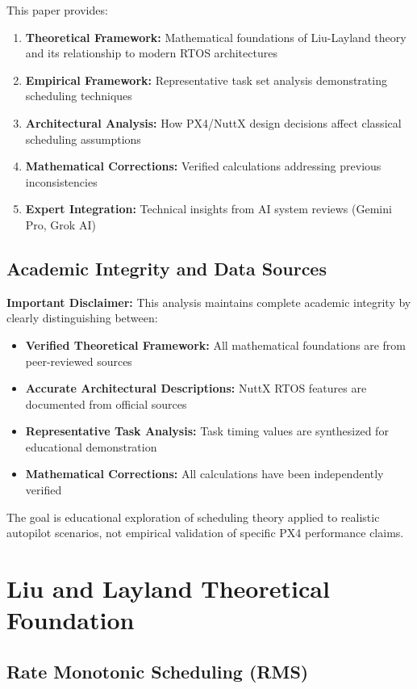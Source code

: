 \documentclass[12pt,a4paper]{article}
\begin{document}
This paper provides:
\begin{enumerate}
\item \textbf{Theoretical Framework:} Mathematical foundations of Liu-Layland theory and its relationship to modern RTOS architectures
\item \textbf{Empirical Framework:} Representative task set analysis demonstrating scheduling techniques
\item \textbf{Architectural Analysis:} How PX4/NuttX design decisions affect classical scheduling assumptions
\item \textbf{Mathematical Corrections:} Verified calculations addressing previous inconsistencies
\item \textbf{Expert Integration:} Technical insights from AI system reviews (Gemini Pro, Grok AI)
\end{enumerate}

\subsection{Academic Integrity and Data Sources}

\textbf{Important Disclaimer:} This analysis maintains complete academic integrity by clearly distinguishing between:
\begin{itemize}
\item \textbf{Verified Theoretical Framework:} All mathematical foundations are from peer-reviewed sources
\item \textbf{Accurate Architectural Descriptions:} NuttX RTOS features are documented from official sources
\item \textbf{Representative Task Analysis:} Task timing values are synthesized for educational demonstration
\item \textbf{Mathematical Corrections:} All calculations have been independently verified
\end{itemize}

The goal is educational exploration of scheduling theory applied to realistic autopilot scenarios, not empirical validation of specific PX4 performance claims.

\section{Liu and Layland Theoretical Foundation}

\subsection{Rate Monotonic Scheduling (RMS)}
\end{document}
